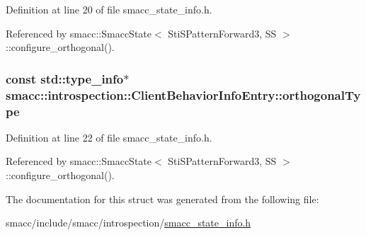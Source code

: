 Definition at line 20 of file smacc\+\_\+state\+\_\+info.\+h.



Referenced by smacc\+::\+Smacc\+State$<$ Sti\+S\+Pattern\+Forward3, S\+S $>$\+::configure\+\_\+orthogonal().

\subsubsection[{\texorpdfstring{orthogonal\+Type}{orthogonalType}}]{\setlength{\rightskip}{0pt plus 5cm}const std\+::type\+\_\+info$\ast$ smacc\+::introspection\+::\+Client\+Behavior\+Info\+Entry\+::orthogonal\+Type}\hypertarget{structsmacc_1_1introspection_1_1ClientBehaviorInfoEntry_aabffb57e6ee723ce1b2bdb6ad30c6993}{}\label{structsmacc_1_1introspection_1_1ClientBehaviorInfoEntry_aabffb57e6ee723ce1b2bdb6ad30c6993}


Definition at line 22 of file smacc\+\_\+state\+\_\+info.\+h.



Referenced by smacc\+::\+Smacc\+State$<$ Sti\+S\+Pattern\+Forward3, S\+S $>$\+::configure\+\_\+orthogonal().



The documentation for this struct was generated from the following file\+:\begin{DoxyCompactItemize}
\item 
smacc/include/smacc/introspection/\hyperlink{smacc__state__info_8h}{smacc\+\_\+state\+\_\+info.\+h}\end{DoxyCompactItemize}

